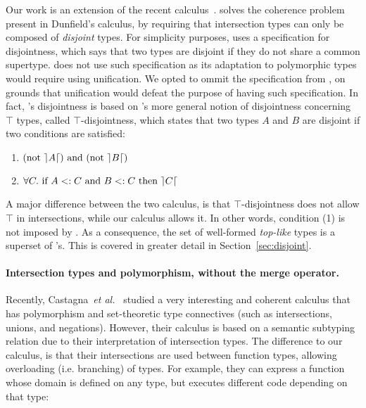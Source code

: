 Our work is an extension of the recent \oldname calculus~\cite{oliveira16disjoint}.
\oldname solves the coherence problem present in Dunfield's calculus, by requiring that
intersection types can only be composed of \emph{disjoint} types.
For simplicity purposes, \oldname uses a specification for disjointness, which says that two types are 
disjoint if they do not share a common supertype.
\name does not use such specification as its adaptation to polymorphic types would require
using unification.
We opted to ommit the specification from \name, on grounds that unification would defeat
the purpose of having such specification.
In fact, \name's disjointness is based on \oldname's more
general notion of disjointness concerning $\top$ types, called $\top$-disjointness, which 
states that two types $A$ and $B$ are disjoint if two conditions are satisfied:
\begin{enumerate}
  \item $(\text{not}~\rceil A \lceil)~\text{and}~(\text{not}~\rceil B \lceil) $
  \item $\forall C.~\text{if}~ A <: C~\text{and}~B <: C~\text{then}~\rceil C \lceil$
\end{enumerate}
\noindent A major difference between the two calculus, is that $\top$-disjointness does not allow
$\top$ in intersections, while our calculus allows it.
In other words, condition (1) is not imposed by \name.
As a consequence, the set of well-formed \emph{top-like} types is a superset of \oldname's.
This is covered in greater detail in Section~\ref{sec:disjoint}.

\paragraph{Intersection types and polymorphism, without the merge operator.}
Recently, Castagna~\textit{et al.}~\cite{Castagna:2014} studied a very interesting
and coherent calculus that has polymorphism and set-theoretic type connectives (such as
intersections, unions, and negations). 
However, their calculus is based on a semantic subtyping relation due to their 
interpretation of intersection types.
The difference to our calculus, is that their intersections are used between function
types, allowing overloading (i.e. branching) of types.
For example, they can express a function whose domain is defined on any type, but executes different
code depending on that type:

